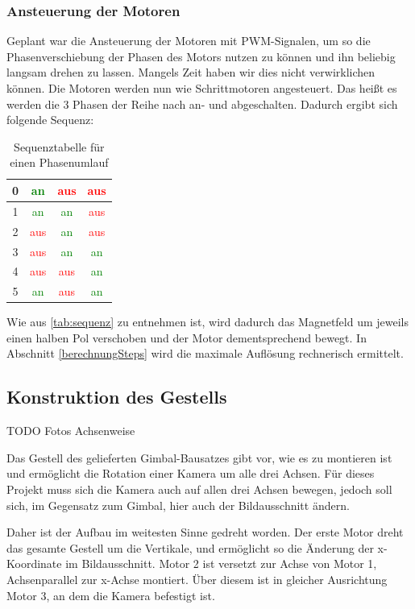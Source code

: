 \documentclass[12pt,a4paper,bibliography=totocnumbered,listof=totocnumbered]{scrartcl}
\begin{document}
\subsubsection{Ansteuerung der Motoren}
Geplant war die Ansteuerung der Motoren mit PWM-Signalen, um so die Phasenverschiebung der Phasen des Motors nutzen zu können und ihn beliebig langsam drehen zu lassen. Mangels Zeit haben wir dies nicht verwirklichen können. Die Motoren werden nun wie Schrittmotoren angesteuert. Das heißt es werden die 3 Phasen der Reihe nach an- und abgeschalten. Dadurch ergibt sich folgende Sequenz:
\begin{table}[htp] 
	\centering 
	\begin{tabular}{|c|c|c|c|}
		\hline
		0 & \textcolor{green}{an} & \textcolor{red}{aus} & \textcolor{red}{aus}  \\ 
		\hline 
		1 & \textcolor{green}{an} & \textcolor{green}{an} & \textcolor{red}{aus}  \\ 
		\hline 
		2 & \textcolor{red}{aus}  & \textcolor{green}{an} & \textcolor{red}{aus}  \\ 
		\hline 
		3 & \textcolor{red}{aus}  & \textcolor{green}{an} & \textcolor{green}{an} \\ 
		\hline 
		4 & \textcolor{red}{aus}  & \textcolor{red}{aus}  & \textcolor{green}{an} \\ 
		\hline 
		5 & \textcolor{green}{an} & \textcolor{red}{aus}  & \textcolor{green}{an} \\ 
		\hline
	\end{tabular} 
	\caption{Sequenztabelle für einen Phasenumlauf} 
	\label{tab:sequenz}
\end{table}

Wie aus \autoref{tab:sequenz} zu entnehmen ist, wird dadurch das Magnetfeld um jeweils einen halben Pol verschoben und der Motor dementsprechend bewegt. In Abschnitt \ref{berechnungSteps} wird die maximale Auflösung rechnerisch ermittelt.
\subsection{Konstruktion des Gestells}
TODO Fotos Achsenweise

Das Gestell des gelieferten Gimbal-Bausatzes gibt vor, wie es zu montieren ist und ermöglicht die Rotation einer Kamera um alle drei Achsen. Für dieses Projekt muss sich die Kamera auch auf allen drei Achsen bewegen, jedoch soll sich, im Gegensatz zum Gimbal, hier auch der Bildausschnitt ändern.

Daher ist der Aufbau im weitesten Sinne gedreht worden. Der erste Motor dreht das gesamte Gestell um die Vertikale, und ermöglicht so die Änderung der x-Koordinate im Bildausschnitt. Motor 2 ist versetzt zur Achse von Motor 1, Achsenparallel zur x-Achse montiert. Über diesem ist in gleicher Ausrichtung Motor 3, an dem die Kamera befestigt ist.
\end{document}
